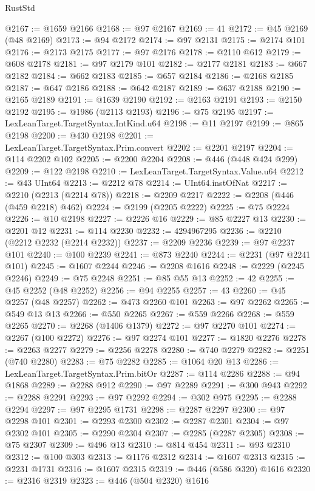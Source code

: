 \begin{lexlean}{RustStd}
\begin{coremodule}
@2167 := @1659 @2166
@2168 := @97 @2167
@2169 := 41
@2172 := @45 @2169 (@48 @2169)
@2173 := @94 @2172
@2174 := @97 @2131
@2175 := @2174 @101
@2176 := @2173 @2175
@2177 := @97 @2176
@2178 := @2110 @612
@2179 := @608 @2178
@2181 := @97 @2179 @101
@2182 := @2177 @2181
@2183 := @667 @2182
@2184 := @662 @2183
@2185 := @657 @2184
@2186 := @2168 @2185
@2187 := @647 @2186
@2188 := @642 @2187
@2189 := @637 @2188
@2190 := @2165 @2189
@2191 := @1639 @2190
@2192 := @2163 @2191
@2193 := @2150 @2192
@2195 := @1986 (@2113 @2193)
@2196 := @75 @2195
@2197 := LexLeanTarget.TargetSyntax.IntKind.u64
@2198 := @11 @2197
@2199 := @865 @2198
@2200 := @430 @2198
@2201 := LexLeanTarget.TargetSyntax.Prim.convert
@2202 := @2201 @2197
@2204 := @114 @2202 @102
@2205 := @2200 @2204
@2208 := @446 (@448 @424 @299)
@2209 := @122 @2198
@2210 := LexLeanTarget.TargetSyntax.Value.u64
@2212 := @43 UInt64
@2213 := @2212 @78
@2214 := UInt64.instOfNat
@2217 := @2210 (@2213 (@2214 @78))
@2218 := @2209 @2217
@2222 := @2208 (@446 (@459 @2218) @462)
@2224 := @2199 (@2205 @2222)
@2225 := @75 @2224
@2226 := @10 @2198
@2227 := @2226 @16
@2229 := @85 @2227 @13
@2230 := @2201 @12
@2231 := @114 @2230
@2232 := 4294967295
@2236 := @2210 (@2212 @2232 (@2214 @2232))
@2237 := @2209 @2236
@2239 := @97 @2237 @101
@2240 := @100 @2239
@2241 := @873 @2240
@2244 := @2231 (@97 @2241 @101)
@2245 := @1607 @2244
@2246 := @2208 @1616
@2248 := @2229 (@2245 @2246)
@2249 := @75 @2248
@2251 := @85 @55 @13
@2252 := 42
@2255 := @45 @2252 (@48 @2252)
@2256 := @94 @2255
@2257 := 43
@2260 := @45 @2257 (@48 @2257)
@2262 := @473 @2260 @101
@2263 := @97 @2262
@2265 := @549 @13 @13
@2266 := @550 @2265
@2267 := @559 @2266
@2268 := @559 @2265
@2270 := @2268 (@1406 @1379)
@2272 := @97 @2270 @101
@2274 := @2267 (@100 @2272)
@2276 := @97 @2274 @101
@2277 := @1820 @2276
@2278 := @2263 @2277
@2279 := @2256 @2278
@2280 := @740 @2279
@2282 := @2251 (@740 @2280)
@2283 := @75 @2282
@2285 := @1064 @20 @13
@2286 := LexLeanTarget.TargetSyntax.Prim.bitOr
@2287 := @114 @2286
@2288 := @94 @1868
@2289 := @2288 @912
@2290 := @97 @2289
@2291 := @300 @943
@2292 := @2288 @2291
@2293 := @97 @2292
@2294 := @302 @975
@2295 := @2288 @2294
@2297 := @97 @2295 @1731
@2298 := @2287 @2297
@2300 := @97 @2298 @101
@2301 := @2293 @2300
@2302 := @2287 @2301
@2304 := @97 @2302 @101
@2305 := @2290 @2304
@2307 := @2285 (@2287 @2305)
@2308 := @75 @2307
@2309 := @496 @13
@2310 := @814 @454
@2311 := @93 @2310
@2312 := @100 @303
@2313 := @1176 @2312
@2314 := @1607 @2313
@2315 := @2231 @1731
@2316 := @1607 @2315
@2319 := @446 (@586 @320) @1616
@2320 := @2316 @2319
@2323 := @446 (@504 @2320) @1616

\end{coremodule}
\end{lexlean}
